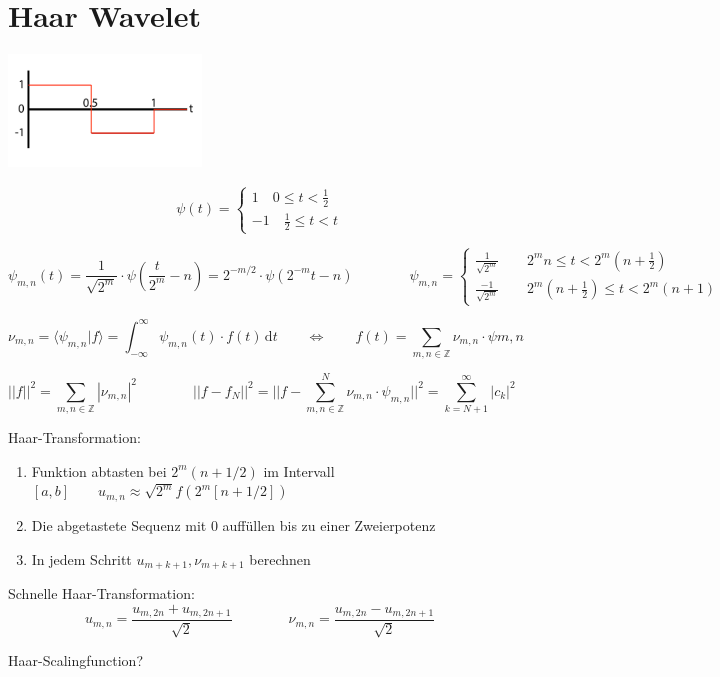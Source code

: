 \section{Haar Wavelet}

\begin{center}
	\begin{minipage}[c]{0.3\textwidth}
		\includegraphics[height=3cm]{content/HaarWavelet.pdf}
	\end{minipage}	
	\begin{minipage}[c]{0.3\textwidth}
		\[
			\psi(t)=\begin{cases} 1 \quad 0 \leq t < \frac{1}{2}\\ -1 \quad \frac{1}{2} \leq t < t  \end{cases}  
		\]
	\end{minipage}
\end{center}


\[  
	\psi_{m,n}(t)=\frac{1}{\sqrt{2^m}} \cdot \psi(\frac{t}{2^m} - n) = 2^{-m/2} \cdot \psi(2^{-m}t-n) 
	\qquad \qquad
	\psi_{m,n}  = \begin{cases} 
	\frac{1}{\sqrt{2^m}} \qquad 2^m n \leq t < 2^m(n+\frac{1}{2}) \\ 
	\frac{-1}{\sqrt{2^m}} \qquad 2^m(n+\frac{1}{2}) \leq t < 2^m(n+1)
	\end{cases}
\]

\[ 
	\nu_{m,n} = \langle \psi_{m,n} | f \rangle = \int_{-\infty}^{\infty}\psi_{m,n}(t) \cdot f(t) \,\mathrm{d}t
	\qquad \Longleftrightarrow \qquad
	f(t)=\sum_{m,n \in \mathbb{Z}} \nu_{m,n} \cdot \psi{m,n}
\]
	
\[  
	||f||^2 = \sum_{m,n \in \mathbb{Z}} |\nu_{m,n}|^2 \qquad \qquad ||f-f_N||^2 = ||f - \sum_{m,n \in \mathbb{Z}}^N \nu_{m,n} \cdot \psi_{m,n}||^2 = \sum_{k=N+1}^{\infty} |c_k|^2
\]

Haar-Transformation:
\begin{enumerate}
	\item Funktion abtasten bei $2^m(n+1/2)$ im Intervall $[a,b] \qquad u_{m,n}\approx \sqrt{2^m}f(2^m[n+1/2])$ 
	\item Die abgetastete Sequenz mit 0 auffüllen bis zu einer Zweierpotenz
	\item In jedem Schritt $u_{m+k+1}, \nu_{m+k+1}$ berechnen
\end{enumerate}

Schnelle Haar-Transformation:
\[  
	u_{m,n} = \dfrac{u_{m,2n}+u_{m,2n+1}}{\sqrt{2}} 
	\qquad \qquad
	\nu_{m,n} = \dfrac{u_{m,2n}-u_{m,2n+1}}{\sqrt{2}}
\]

Haar-Scalingfunction?